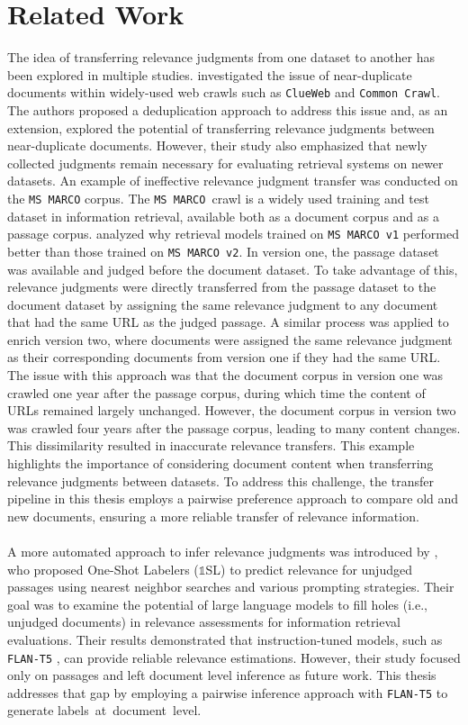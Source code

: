 \chapter{Related Work}\label{related-work}

The idea of transferring relevance judgments from one dataset to another has been explored in multiple studies. \citet{froebe:2021} investigated the issue of near-duplicate documents within widely-used web crawls such as \texttt{ClueWeb} and \texttt{Common Crawl}. The authors proposed a deduplication approach to address this issue and, as an extension, explored the potential of transferring relevance judgments between near-duplicate documents. However, their study also emphasized that newly collected judgments remain necessary for evaluating retrieval systems on newer datasets. An example of ineffective relevance judgment transfer was conducted on the  \texttt{MS MARCO} corpus. The \mbox{\texttt{MS MARCO} crawl} is a widely used training and test dataset in information retrieval, available both as a document corpus and as a passage corpus. \citet{froebe:2022} analyzed  why retrieval models trained on \texttt{MS MARCO v1} performed better than those trained on \texttt{MS MARCO  v2}. In version one, the passage dataset was available and judged before the document dataset. To take advantage of this, relevance judgments were directly transferred from the passage dataset to the document dataset by assigning the same relevance judgment to any document that had the same URL as the judged passage. A similar process was applied to enrich version two, where documents were assigned the same relevance judgment as their corresponding documents from version one if they had the same URL. The issue with this approach was that the document corpus in version one was crawled one year after the passage corpus, during which time the content of URLs remained largely unchanged. However, the document corpus in version two was crawled four years after the passage corpus, leading to many content changes. This dissimilarity resulted in inaccurate relevance transfers. This example highlights the importance of considering document content when transferring relevance judgments between datasets. To address this challenge, the transfer pipeline in this thesis employs a pairwise preference approach to compare old and new documents, ensuring a more reliable transfer of relevance information.
\\\\
A more automated approach to infer relevance judgments was introduced by \citet{macavaney:2023}, who proposed One-Shot Labelers ($\mathbb{1}$SL) to predict relevance for unjudged passages using nearest neighbor searches and various prompting strategies. Their goal was to examine the potential of large language models to fill \glqq holes\grqq{} (i.e., unjudged documents) in relevance assessments for information retrieval evaluations. Their results demonstrated that instruction-tuned models, such as \texttt{FLAN-T5} \citep{chung:2022}, can provide reliable relevance estimations. However, their study focused only on passages and left document level inference as future work. This thesis addresses that gap by employing a pairwise inference approach with \texttt{FLAN-T5} to generate \mbox{labels at document level}.
